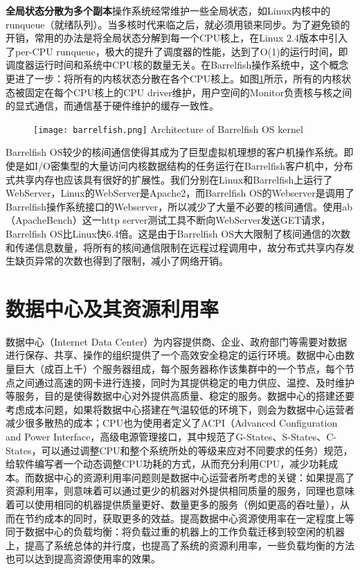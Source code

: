 \noindent\textbf{全局状态分散为多个副本}\quad 操作系统经常维护一些全局状态，如Linux内核中的runqueue（就绪队列）。当多核时代来临之后，就必须用锁来同步。为了避免锁的开销，常用的办法是将全局状态分解到每一个CPU核上，在Linux 2.4版本\cite{linux}中引入了per-CPU runqueue，极大的提升了调度器的性能，达到了O(1)的运行时间，即调度器运行时间和系统中CPU核的数量无关。在Barrelfish操作系统中，这个概念更进了一步：将所有的内核状态分散在各个CPU核上。如图\ref{fig:barrelfish}所示，所有的内核状态被固定在每个CPU核上的CPU driver维护，用户空间的Monitor负责核与核之间的显式通信，而通信基于硬件维护的缓存一致性。

\begin{figure}[!htp]
  \centering
  \texttt{[image: barrelfish.png]}
    {Architecture of Barrelfish OS kernel}
  \label{fig:barrelfish}
\end{figure}
Barrelfish OS较少的核间通信使得其成为了巨型虚拟机理想的客户机操作系统。即使是如I/O密集型的大量访问内核数据结构的任务运行在Barrelfish客户机中，分布式共享内存也应该具有很好的扩展性。我们分别在Linux和Barrelfish上运行了WebServer，Linux的WebServer是Apache2，而Barrelfish OS的Webserver是调用了Barrelfish操作系统接口的Webserver，所以减少了大量不必要的核间通信。使用ab（ApacheBench）\cite{ab}这一http server测试工具不断向WebServer发送GET请求，Barrelfish OS比Linux快6.4倍\cite{giantvm}。这是由于Barrelfish OS大大限制了核间通信的次数和传递信息数量，将所有的核间通信限制在远程过程调用中，故分布式共享内存发生缺页异常的次数也得到了限制，减小了网络开销。
\section{数据中心及其资源利用率}
数据中心（Internet Data Center）为内容提供商、企业、政府部门等需要对数据进行保存、共享、操作的组织提供了一个高效安全稳定的运行环境。数据中心由数量巨大（成百上千）个服务器组成，每个服务器称作该集群中的一个节点，每个节点之间通过高速的网卡进行连接，同时为其提供稳定的电力供应、温控、及时维护等服务，目的是使得数据中心对外提供高质量、稳定的服务。数据中心的搭建还要考虑成本问题，如果将数据中心搭建在气温较低的环境下，则会为数据中心运营者减少很多散热的成本；CPU也为使用者定义了ACPI（Advanced Configuration and Power Interface，高级电源管理接口，其中规范了G-States、S-States、C-States，可以通过调整CPU和整个系统所处的等级来应对不同要求的任务）规范，给软件编写者一个动态调整CPU功耗的方式，从而充分利用CPU，减少功耗成本。而数据中心的资源利用率问题则是数据中心运营者所考虑的关键：如果提高了资源利用率，则意味着可以通过更少的机器对外提供相同质量的服务，同理也意味着可以使用相同的机器提供质量更好、数量更多的服务（例如更高的吞吐量），从而在节约成本的同时，获取更多的效益。提高数据中心资源使用率在一定程度上等同于数据中心的负载均衡：将负载过重的机器上的工作负载迁移到较空闲的机器上，提高了系统总体的并行度，也提高了系统的资源利用率，一些负载均衡的方法也可以达到提高资源使用率的效果。

